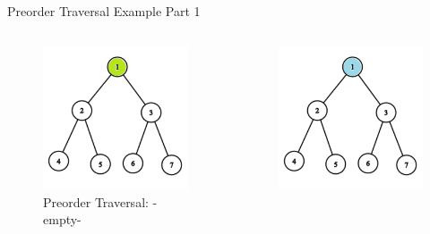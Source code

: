 \documentclass[aspectratio=169]{beamer}%
\begin{document}
\begin{frame}{Preorder Traversal Example Part 1}
    \begin{columns}
        \begin{column}{0.32\textwidth}
            \begin{figure}
                \centering
                \includegraphics[width = .9\linewidth]{tree-pre 1.png}
                \caption{Preorder Traversal: -empty-}
            \end{figure}
        \end{column}
        \hfill
        \begin{column}{0.32\textwidth}
            \begin{figure}
                \centering
                \includegraphics[width = .9\linewidth]{tree-pre 2.png}

\end{figure}
\end{column}
\end{columns}
\end{frame}
\end{document}
